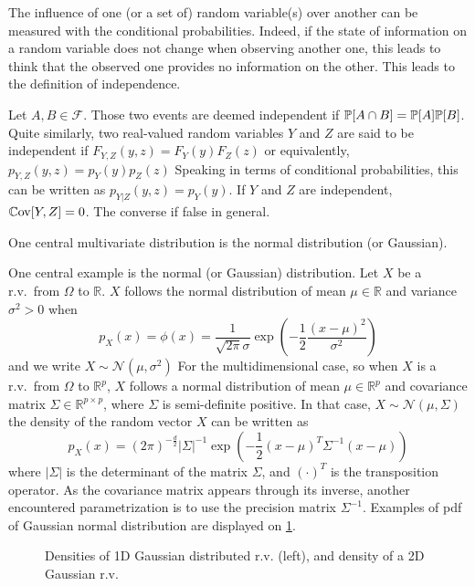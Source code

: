 \documentclass[../../Main_ManuscritThese.tex]{subfiles}
\begin{document}
The influence of one (or a set of) random variable(s) over another can be measured with the conditional probabilities. Indeed, if the state of information on a random variable does not change when observing another one, this leads to think that the observed one provides no information on the other. This leads to the definition of independence.
\begin{definition}[Independence]
  Let $A,B\in \mathcal{F}$. Those two events are deemed independent if $\mathbb{P}[A \cap B] = \mathbb{P}[A]\mathbb{P}[B]$.
  Quite similarly, two real-valued random variables $Y$ and $Z$ are said to be independent if $F_{Y,Z}(y,z) = F_Y(y) F_Z(z)$ or equivalently, $p_{Y,Z}(y,z) = p_Y(y) p_Z(z)$
  Speaking in terms of conditional probabilities, this can be written as $p_{Y|Z}(y,z) = p_{Y}(y)$.
  If $Y$ and $Z$ are independent, $\mathbb{C}\mathrm{ov}[Y, Z] = 0$. The converse if false in general.
\end{definition}
One central multivariate distribution is the normal distribution (or Gaussian).
\begin{example}
  \label{ex:gaussian_distribution}
  One central example is the normal (or Gaussian) distribution. Let $X$ be a r.v.\ from $\Omega$ to $\mathbb{R}$.
  $X$ follows the normal distribution of mean $\mu \in \mathbb{R}$ and variance $\sigma^2>0$ when
  \begin{equation}
    p_X(x) = \phi(x) = \frac{1}{\sqrt{2\pi}\sigma}\exp\left(-\frac{1}{2}\frac{(x-\mu)^2}{\sigma^2}\right)
  \end{equation}
and we write $X \sim \mathcal{N}(\mu,\sigma^2)$
For the multidimensional case, so when $X$ is a r.v.\ from $\Omega$ to $\mathbb{R}^p$,
$X$ follows a normal distribution of mean $\mu \in \mathbb{R}^p$ and covariance matrix $\Sigma \in \mathbb{R}^{p\times p}$, where $\Sigma$ is semi-definite positive.
In that case, $X\sim \mathcal{N}(\mu, \Sigma)$ the density of the random vector $X$ can be written as
\begin{equation}
    p_X(x) = (2\pi)^{-\frac{d}{2}}\lvert\Sigma\rvert^{-1}\exp\left(-\frac{1}{2}(x-\mu)^T\Sigma^{-1}(x-\mu)\right)
  \end{equation}
  where $|\Sigma|$ is the determinant of the matrix $\Sigma$, and $(\cdot)^T$ is the transposition operator.
  As the covariance matrix appears through its inverse, another encountered parametrization is to use the precision matrix $\Sigma^{-1}$.
  Examples of pdf of Gaussian normal distribution are displayed on \cref{fig:example_normal}.
\end{example}
\begin{figure}[!h]
  \centering
  
  \caption{Densities of 1D Gaussian distributed r.v. (left), and density of a 2D Gaussian r.v.}
  \label{fig:example_normal}
\end{figure}
\end{document}
